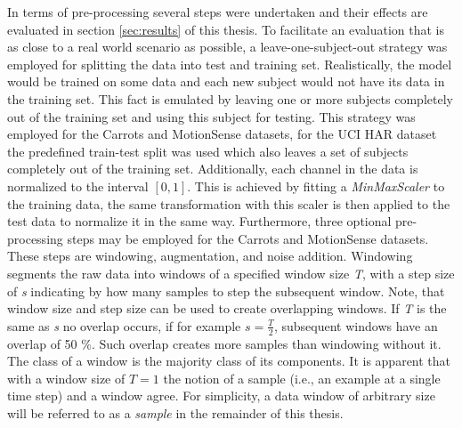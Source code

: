 \documentclass[11pt,titlepage,oneside,openany]{book}
\begin{document}
In terms of pre-processing several steps were undertaken and their effects are evaluated in section \ref{sec:results} of this thesis. To facilitate an evaluation that is as close to a real world scenario as possible, a leave-one-subject-out strategy was employed for splitting the data into test and training set. Realistically, the model would be trained on some data and each new subject would not have its data in the training set. This fact is emulated by leaving one or more subjects completely out of the training set and using this subject for testing. This strategy was employed for the Carrots and MotionSense datasets, for the UCI HAR dataset the predefined train-test split was used which also leaves a set of subjects completely out of the training set. Additionally, each channel in the data is normalized to the interval $[0,1]$. This is achieved by fitting a \emph{MinMaxScaler} to the training data, the same transformation with this scaler is then applied to the test data to normalize it in the same way. Furthermore, three optional pre-processing steps may be employed for the Carrots and MotionSense datasets. These steps are windowing, augmentation, and noise addition. Windowing segments the raw data into windows of a specified window size \emph{T}, with a step size of \emph{s} indicating by how many samples to step the subsequent window. Note, that window size and step size can be used to create overlapping windows. If \emph{T} is the same as \emph{s} no overlap occurs, if for example $s = \frac{T}{2}$, subsequent windows have an overlap of 50 \%. Such overlap creates more samples than windowing without it. The class of a window is the majority class of its components. It is apparent that with a window size of $T=1$ the notion of a sample (i.e., an example at a single time step) and a window agree. For simplicity, a data window of arbitrary size will be referred to as a \emph{sample} in the remainder of this thesis.
\end{document}
